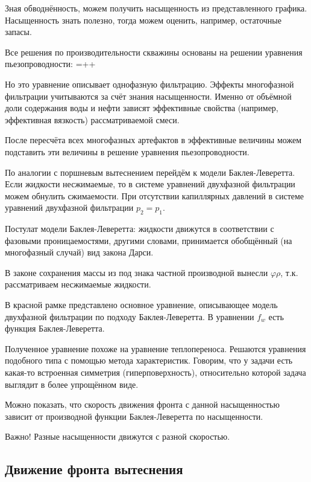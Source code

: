 \documentclass[main.tex]{subfiles}
\begin{document}
Зная обводнённость, можем получить насыщенность из представленного графика. Насыщенность знать полезно, тогда можем оценить, например, остаточные запасы.

Все решения по производительности скважины основаны на решении уравнения пьезопроводности:
\beq
{}=++
\eeq

Но это уравнение описывает однофазную фильтрацию. Эффекты многофазной фильтрации учитываются за счёт знания насыщенности. Именно от объёмной доли содержания воды и нефти зависят эффективные свойства (например, эффективная вязкость) рассматриваемой смеси.

После пересчёта всех многофазных артефактов в эффективные величины можем подставить эти величины в решение уравнения пьезопроводности.



По аналогии с поршневым вытеснением перейдём к модели Баклея-Леверетта. Если жидкости несжимаемые, то в системе уравнений двухфазной фильтрации можем обнулить сжимаемости. При отсутствии капиллярных давлений в системе уравнений двухфазной фильтрации $p_2=p_1$.

Постулат модели Баклея-Леверетта: жидкости движутся в соответствии с фазовыми проницаемостями, другими словами, принимается обобщённый (на многофазный случай) вид закона Дарси.

В законе сохранения массы из под знака частной производной вынесли $\varphi\rho$, т.к. рассматриваем несжимаемые жидкости.

В красной рамке представлено основное уравнение, описывающее модель двухфазной фильтрации по подходу Баклея-Леверетта. В уравнении $f_w$ есть функция Баклея-Леверетта.

Полученное уравнение похоже на уравнение теплопереноса. Решаются уравнения подобного типа с помощью метода характеристик. Говорим, что у задачи есть какая-то встроенная симметрия (гиперповерхность), относительно которой задача выглядит в более упрощённом виде. 


Можно показать, что скорость движения фронта с данной насыщенностью зависит от производной функции Баклея-Леверетта по насыщенности.

Важно! Разные насыщенности движутся с разной скоростью.

\subsection{Движение фронта вытеснения}
\end{document}
